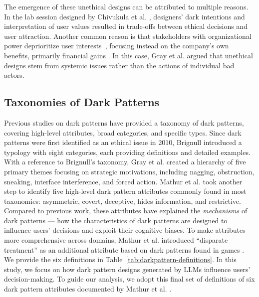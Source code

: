 The emergence of these unethical designs can be attributed to multiple reasons. In the lab session designed by Chivukula et al. \cite{a:47}, designers' dark intentions and interpretation of user values resulted in trade-offs between ethical decisions and user attraction. Another common reason is that stakeholders with organizational power deprioritize user interests~\cite{a:46}, focusing instead on the company's own benefits, primarily financial gains \cite{a:48}. In this case, Gray et al. \cite{a:49} argued that unethical designs stem from systemic issues rather than the actions of individual bad actors.

\subsection{Taxonomies of Dark Patterns}

Previous studies on dark patterns have provided a taxonomy of dark patterns, covering high-level attributes, broad categories, and specific types. Since dark patterns were first identified as an ethical issue in 2010, Brignull \cite{a:51} introduced a typology with eight categories, each providing definitions and detailed examples. With a reference to Brignull's taxonomy, Gray et al. \cite{a:11} created a hierarchy of five primary themes focusing on strategic motivations, including nagging, obstruction, sneaking, interface interference, and forced action. Mathur et al. \cite{a:9} took another step to identify five high-level dark pattern attributes commonly found in most taxonomies: asymmetric, covert, deceptive, hides information, and restrictive. Compared to previous work, these attributes have explained the \textit{mechanisms} of dark patterns --- how the characteristics of dark patterns are designed to influence users' decisions and exploit their cognitive biases. To make attributes more comprehensive across domains, Mathur et al. \cite{a:44} introduced ``disparate treatment'' as an additional attribute based on dark patterns found in games \cite{a:52}. We provide the six definitions in Table~\ref{tab:darkpattern-definitions}. %
In this study, we focus on how dark pattern designs generated by LLMs influence users' decision-making. To guide our analysis, we adopt this final set of definitions of six dark pattern attributes documented by Mathur et al. \cite{a:44}.
